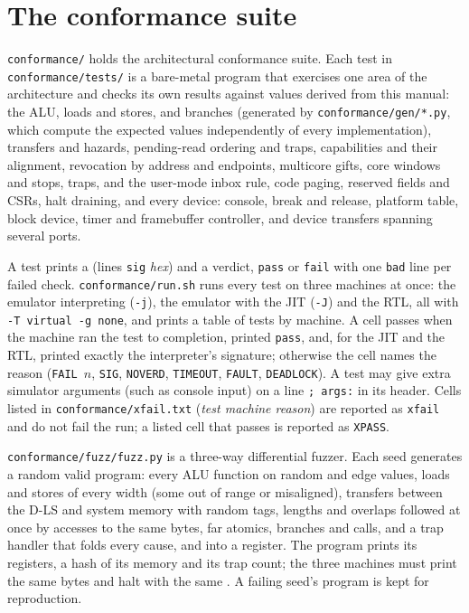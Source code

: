 \section{The conformance suite}\label{sec:conformance}

\texttt{conformance/} holds the architectural conformance suite. Each test in
\texttt{conformance/tests/} is a bare-metal program that exercises one area of the architecture and
checks its own results against values derived from this manual: the ALU, loads and stores, and branches
(generated by \texttt{conformance/gen/*.py}, which compute the expected values independently of every
implementation), transfers and hazards, pending-read ordering and  traps, capabilities and
their alignment, revocation by address and endpoints, multicore gifts, core windows and stops, traps,
 and the user-mode inbox rule, code paging, reserved fields and CSRs, halt draining, and every
device: console, break and release, platform table, block device, timer and framebuffer controller,
and device transfers spanning several ports.

A test prints a  (lines \texttt{sig} \textit{hex}) and a verdict, \texttt{pass} or
\texttt{fail} with one \texttt{bad} line per failed check. \texttt{conformance/run.sh} runs every test
on three machines at once: the emulator interpreting (\texttt{-j}), the emulator with the JIT
(\texttt{-J}) and the RTL, all with \texttt{-T virtual -g none}, and prints a table of tests by machine.
A cell passes when the machine ran the test to completion, printed \texttt{pass}, and, for the JIT and
the RTL, printed exactly the interpreter's signature; otherwise the cell names the reason
(\texttt{FAIL}~$n$, \texttt{SIG}, \texttt{NOVERD}, \texttt{TIMEOUT}, \texttt{FAULT}, \texttt{DEADLOCK}).
A test may give extra simulator arguments (such as console input) on a line \texttt{; args:} in its
header. Cells listed in \texttt{conformance/xfail.txt} (\textit{test machine reason}) are reported as
\texttt{xfail} and do not fail the run; a listed cell that passes is reported as \texttt{XPASS}.

\texttt{conformance/fuzz/fuzz.py} is a three-way differential fuzzer. Each seed generates a random
valid program: every ALU function on random and edge values, loads and stores of every width (some out
of range or misaligned), transfers between the D-LS and system memory with random tags, lengths and
overlaps followed at once by accesses to the same bytes, far atomics, branches and calls, and a trap
handler that folds every cause,  and  into a register. The program prints its
registers, a hash of its memory and its trap count; the three machines must print the same bytes and
halt with the same . A failing seed's program is kept for reproduction.

